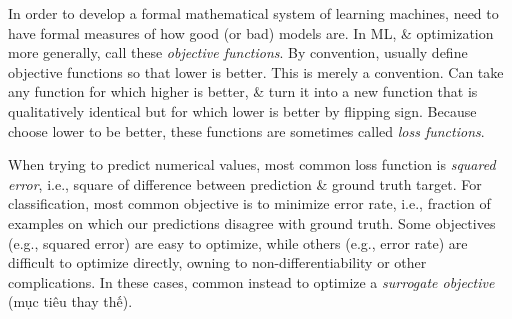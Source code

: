 \documentclass{article}
\begin{document}
\begin{itemize}
\begin{itemize}
\begin{itemize}
			In order to develop a formal mathematical system of learning machines, need to have formal measures of how good (or bad) models are. In ML, \& optimization more generally, call these {\it objective functions}. By convention, usually define objective functions so that lower is better. This is merely a convention. Can take any function for which higher is better, \& turn it into a new function that is qualitatively identical but for which lower is better by flipping sign. Because choose lower to be better, these functions are sometimes called {\it loss functions}.

			When trying to predict numerical values, most common loss function is {\it squared error}, i.e., square of difference between prediction \& ground truth target. For classification, most common objective is to minimize error rate, i.e., fraction of examples on which our predictions disagree with ground truth. Some objectives (e.g., squared error) are easy to optimize, while others (e.g., error rate) are difficult to optimize directly, owning to non-differentiability or other complications. In these cases, common instead to optimize a {\it surrogate objective} (mục tiêu thay thế).


\end{itemize}
\end{itemize}
\end{itemize}
\end{document}
